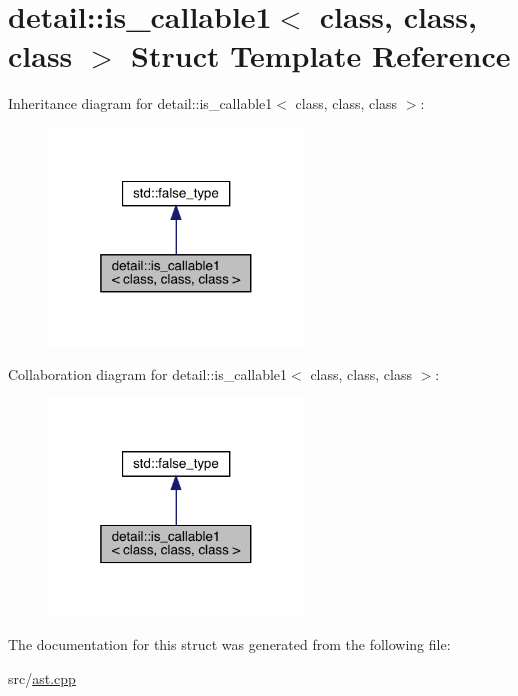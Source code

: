 \hypertarget{structdetail_1_1is__callable1}{}\section{detail\+:\+:is\+\_\+callable1$<$ class, class, class $>$ Struct Template Reference}
\label{structdetail_1_1is__callable1}


Inheritance diagram for detail\+:\+:is\+\_\+callable1$<$ class, class, class $>$\+:
\nopagebreak
\begin{figure}[H]
\begin{center}
\leavevmode
\includegraphics[width=193pt]{structdetail_1_1is__callable1__inherit__graph}
\end{center}
\end{figure}


Collaboration diagram for detail\+:\+:is\+\_\+callable1$<$ class, class, class $>$\+:
\nopagebreak
\begin{figure}[H]
\begin{center}
\leavevmode
\includegraphics[width=193pt]{structdetail_1_1is__callable1__coll__graph}
\end{center}
\end{figure}


The documentation for this struct was generated from the following file\+:\begin{DoxyCompactItemize}
\item 
src/\hyperlink{ast_8cpp}{ast.\+cpp}\end{DoxyCompactItemize}
